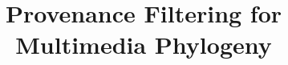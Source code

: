 \documentclass{article}
\title{Provenance Filtering for Multimedia Phylogeny}
\begin{document}

\maketitle
\ninept







\clearpage


\end{document}
